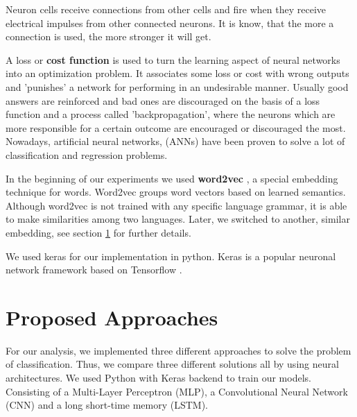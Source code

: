 \documentclass[conference]{IEEEtran}
\theoremstyle{plain}
\theoremstyle{definition}
\theoremstyle{remark}
\begin{document}
Neuron cells receive connections from other cells and fire when they receive electrical impulses from other connected neurons. It is know, that the more a connection is used, the more stronger it will get. 

A loss or \textbf{cost function} is used to turn the learning aspect of neural networks into an optimization problem. It associates some loss or cost with wrong outputs and 'punishes' a network for performing in an undesirable manner. Usually good answers are reinforced and bad ones are discouraged on the basis of a loss function and a process called 'backpropagation', where the neurons which are more responsible for a certain outcome are encouraged or discouraged the most. Nowadays, artificial neural networks, (ANNs) have been proven to solve a lot of classification and regression problems. 


In the beginning of our experiments we used \textbf{word2vec} \cite{word2vec}, a special embedding technique for words. Word2vec groups word vectors based on learned semantics. Although word2vec is not trained with any specific language grammar, it is able to make similarities among two languages. Later, we switched to another, similar embedding, see section \ref{sec:model} for further details.

We used keras \cite{keras} for our implementation in python. Keras is a popular neuronal network framework based on Tensorflow \cite{tensorflow}.
\medskip
\section{Proposed Approaches}
\label{sec:model}

For our analysis, we implemented three different approaches to solve the problem of classification. Thus, we compare three different solutions all by using neural architectures. We used Python with Keras backend to train our models. Consisting of a Multi-Layer Perceptron (MLP), a Convolutional Neural Network (CNN) and a long short-time memory (LSTM).
\end{document}
